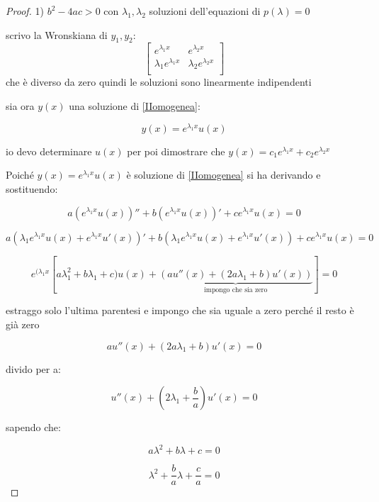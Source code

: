 \documentclass[11pt]{article}
\begin{document}
\begin{proof}
       1) $b^{2}-4ac >0$ con $\lambda_1,\lambda_2$ soluzioni dell'equazioni di $p(\lambda)=0$    

       scrivo la Wronskiana di $y_1,y_2$:
       \[
        \begin{bmatrix}
            
        e ^{\lambda_1 x} & e ^{\lambda_2 x} \\
        \lambda_1e ^{\lambda_1 x} & \lambda_2e ^{\lambda_2 x} \\
        
        \end{bmatrix}
       \]
        che è diverso da zero quindi le soluzioni sono linearmente indipendenti

        sia ora $y(x)$ una soluzione di \ref{IIomogenea}:

        \[
            y(x) = e ^{\lambda_1 x}u(x)
        \]

        io devo determinare $u(x)$ per poi dimostrare che $y(x) = c_1e ^{\lambda_1 x}+c_2 e^{\lambda_2 x}$

        Poiché $y(x) = e ^{\lambda_1 x}u(x)$ è soluzione di \ref{IIomogenea} si ha derivando e sostituendo:

        \[
            a( e ^{\lambda_1 x} u(x))'' + b(e ^{\lambda_1 x}u(x))'+ c e ^{\lambda_1 x}u(x) =0
        \]

        \[
            a(\lambda_1 e ^{\lambda_1 x} u(x)+ e ^{\lambda_1 x}u'(x))' + b(\lambda_1e ^{\lambda_1 x}u(x) + e ^{\lambda_1 x}u'(x))+ c e ^{\lambda_1 x}u(x) =0
        \]

        \[
            e ^{(\lambda_1 x}[a \lambda_1 ^{2} + b \lambda_1+c)u(x)+\underbrace{(au''(x)+(2a \lambda_1 + b)u'(x))}_\text{impongo che sia zero}]=0
        \]

        estraggo solo l'ultima parentesi e impongo che sia uguale a zero perché il resto è già zero

        \[
            au''(x) + (2a \lambda_1 + b) u'(x) = 0
        \]

        divido per a:

        \[
            u''(x) +(2 \lambda_1 + \frac{b}{a}) u'(x) = 0
        \]

        sapendo che:

        \[
            a \lambda^{2} + b \lambda + c =0
        \]

        \[
             \lambda^{2} + \frac{b}{a} \lambda + \frac{c}{a} =0
        \]


\end{proof}
\end{document}
